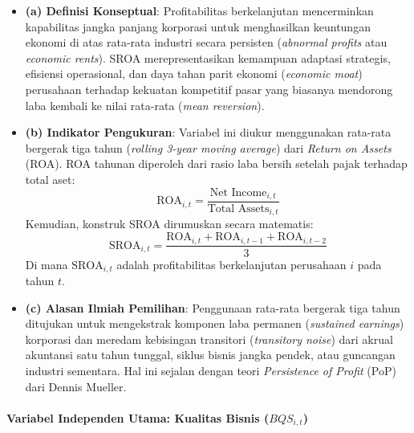 \documentclass[12pt,a4paper]{article}
\providecommand{\tightlist}{%
  \setlength{\itemsep}{0pt}\setlength{\parskip}{0pt}%
}
\begin{document}
\begin{itemize}
\tightlist
\item
  \textbf{(a) Definisi Konseptual}: Profitabilitas berkelanjutan
  mencerminkan kapabilitas jangka panjang korporasi untuk menghasilkan
  keuntungan ekonomi di atas rata-rata industri secara persisten
  (\emph{abnormal profits} atau \emph{economic rents}). SROA
  merepresentasikan kemampuan adaptasi strategis, efisiensi operasional,
  dan daya tahan parit ekonomi (\emph{economic moat}) perusahaan
  terhadap kekuatan kompetitif pasar yang biasanya mendorong laba
  kembali ke nilai rata-rata (\emph{mean reversion}).
\item
  \textbf{(b) Indikator Pengukuran}: Variabel ini diukur menggunakan
  rata-rata bergerak tiga tahun (\emph{rolling 3-year moving average})
  dari \emph{Return on Assets} (ROA). ROA tahunan diperoleh dari rasio
  laba bersih setelah pajak terhadap total aset: \begin{equation}
  \mathrm{ROA}_{i,t} = \frac{\text{Net Income}_{i,t}}{\text{Total Assets}_{i,t}}
  \end{equation} Kemudian, konstruk SROA dirumuskan secara matematis:
  \begin{equation}
  \mathrm{SROA}_{i,t} = \frac{\mathrm{ROA}_{i,t} + \mathrm{ROA}_{i,t-1} + \mathrm{ROA}_{i,t-2}}{3}
  \end{equation} Di mana \(\mathrm{SROA}_{i,t}\) adalah profitabilitas
  berkelanjutan perusahaan \(i\) pada tahun \(t\).
\item
  \textbf{(c) Alasan Ilmiah Pemilihan}: Penggunaan rata-rata bergerak
  tiga tahun ditujukan untuk mengekstrak komponen laba permanen
  (\emph{sustained earnings}) korporasi dan meredam kebisingan
  transitori (\emph{transitory noise}) dari akrual akuntansi satu tahun
  tunggal, siklus bisnis jangka pendek, atau guncangan industri
  sementara. Hal ini sejalan dengan teori \emph{Persistence of Profit}
  (PoP) dari Dennis Mueller.
\end{itemize}

\paragraph{\texorpdfstring{Variabel Independen Utama: Kualitas Bisnis
(\(BQS_{i,t}\))}{Variabel Independen Utama: Kualitas Bisnis (BQS\_\{i,t\})}}\label{variabel-independen-utama-kualitas-bisnis-bqs_it}
\end{document}
